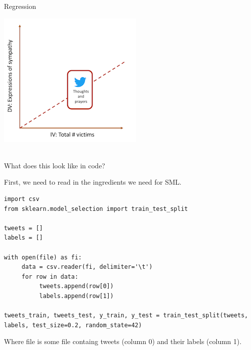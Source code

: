 \documentclass[handout]{beamer}
\begin{document}
\begin{frame}{Regression}
	
	\begin{center}
		\includegraphics{../pictures/Zhangetal_3.png} \\\
	\end{center}
	
	\begin{tiny}
	\end{tiny}
	
	
	
	
\end{frame}


\begin{frame}[fragile]{What does this look like in code?}

First, we need to read in the ingredients we need for SML.
\begin{lstlisting}
import csv
from sklearn.model_selection import train_test_split

tweets = []
labels = []

with open(file) as fi:
     data = csv.reader(fi, delimiter='\t')
     for row in data:
          tweets.append(row[0])
          labels.append(row[1])

tweets_train, tweets_test, y_train, y_test = train_test_split(tweets, labels, test_size=0.2, random_state=42)
\end{lstlisting}
	
Where file is some file containg tweets (column 0) and their labels (column 1).
	
\end{frame}
\end{document}

